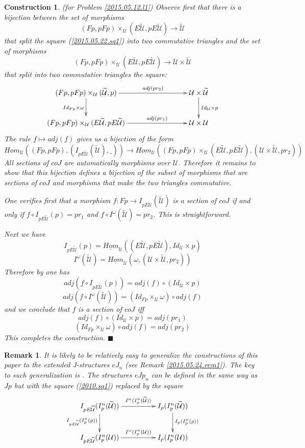 \documentclass[12pt]{article}
\numberwithin{equation}{section}
\newenvironment{eq}{\begin{equation}}{\end{equation}}
\newtheorem{remark}[proposition]{Remark}
\newtheorem{construction0}[proposition]{Construction}
\newenvironment{construction}[1]{\begin{construction0}(for Problem \ref{#1})}{$\blacksquare$ \end{construction0}}
\newcommand{\llabel}[1]{\label{#1}}
\newcommand{\sr}{\rightarrow}
\newcommand{\uu}{\underline}
\newcommand{\iHom}{\uu{Hom}}
\newcommand{\wt}{\widetilde}
\newcommand{\U}{\mathcal{U}}
\begin{document}
%
\begin{construction}{2015.05.12.l1}\rm
\llabel{2015.05.22.constr1} Observe first that there is a bijection between the
set of morphisms
%
$$(Fp,pFp)\times_\U(E\wt{\U},pE\wt{\U})\sr \wt{\U}$$
%
that split the square (\ref{2015.05.22.sq1}) into two commutative triangles and
the set of morphisms
%
$$(Fp,pFp)\times_\U(E\wt{\U},pE\wt{\U})\sr \U\times\wt{\U}$$
%
that split into two commutative triangles the square:
%
$$
\begin{xy}
          \xymatrix@C=7pc{ (Fp,pFp)\times_\U(\wt{\U},p) \ar[r]^-{adj(pr_2)}
            \ar[d]_{Id_{Fp}\times \omega} & \U\times \wt{\U} \ar[d]^{Id_\U\times
              p}\\ (Fp,pFp)\times_\U(E\wt{\U},pE\wt{\U}) \ar[r]^-{adj(pr_1)} &
            \U\times \U }
\end{xy}
$$
%
The rule $f\mapsto adj(f)$ gives us a bijection of the form
%
$$Hom_\U((Fp,pFp),(I_{pE\wt{\U}}(\wt{\U}),\_))\sr Hom_\U((Fp,pFp)\times_\U
(E\wt{\U},pE\wt{\U}), (\U\times\wt{\U}, pr_2))$$
%
All sections of $coJ$ are automatically morphisms over $\U$. Therefore it
remains to show that this bijection defines a bijection of the subset of
morphisms that are sections of $coJ$ and morphisms that make the two triangles
commutative.

One verifies first that a morphism $f:Fp\sr I_{pE\wt{\U}}(\wt{\U})$ is a section
of $coJ$ if and only if $f\circ I_{pE\wt{\U}}(p)=pr_1$ and $f\circ
I^{\omega}(\wt{\U})=pr_2$. This is straightforward.

Next we have
%
$$I_{pE\wt{\U}}(p)=\iHom_\U((E\wt{\U},pE\wt{\U}),Id_\U\times p)$$
$$I^{\omega}(\wt{\U})=\iHom_\U(\omega,(\U\times\wt{\U},pr_2))$$
%
Therefore by \cite[Lemma 8.7]{fromunivwithPi} one has
%
$$adj(f\circ I_{pE\wt{\U}}(p))=adj(f)\circ (Id_\U\times p)$$
$$adj(f\circ I^{\omega}(\wt{\U}))=(Id_{Fp}\times_{\U}\omega)\circ adj(f)$$
%
and we conclude that $f$ is a section of $coJ$ iff
%
$$adj(f)\circ (Id_\U\times p)=adj(pr_1)$$
$$(Id_{Fp}\times_{\U}\omega)\circ adj(f)=adj(pr_2)$$
% 
This completes the construction.
\end{construction}
%
\begin{remark}\rm
\llabel{2015.05.24.rem2} It is likely to be relatively easy to generalize the
constructions of this paper to the extended J-structures $eJ_n$ (see Remark
\ref{2015.05.24.rem1}). The key to such generalization is \cite[Remark
  3.13]{fromunivwithPi}. The structures $eJp_n$ can be defined in the same way
as $Jp$ but with the square (\ref{2010.sq1}) replaced by the square
%
\begin{eq}
\llabel{2015.05.24.sq1}
\begin{xy}
          \xymatrix@C=4pc{ I_{pE\wt{\U}}(I_p^n(\wt{\U}))
            \ar[r]^-{I^{\omega}(I_p^n(\wt{\U}))} \ar[d]_{I_{pE\wt{\U}}(I_p^n(p))}
            & I_p(I_p^n(\wt{\U}))
            \ar[d]^{I_p(I_p^n(p))}\\ I_{pE\wt{\U}}(I_p^n(\U))
            \ar[r]^-{I^{\omega}(I_p^n(\U))} & I_p(I_p^n(\U)) }
\end{xy}
\end{eq}
\end{remark}
%
\end{document}
